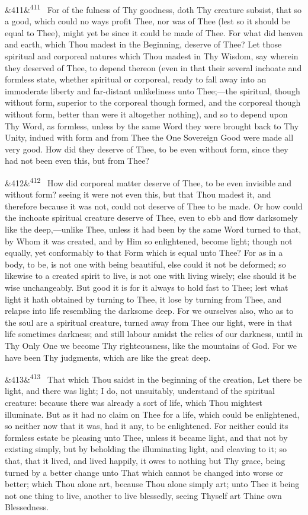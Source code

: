 \documentclass[12pt]{article}
\newcommand{\para}[1][]{\par\noindent\ifx&#1&\else\textsuperscript{\footnotesize #1}~\fi}
\begin{document}
\para[411] For of the fulness of Thy goodness, doth Thy creature subsist, that so a good, which could no ways profit Thee, nor was of Thee (lest so it should be equal to Thee), might yet be since it could be made of Thee. For what did heaven and earth, which Thou madest in the Beginning, deserve of Thee? Let those spiritual and corporeal natures which Thou madest in Thy Wisdom, say wherein they deserved of Thee, to depend thereon (even in that their several inchoate and formless state, whether spiritual or corporeal, ready to fall away into an immoderate liberty and far-distant unlikeliness unto Thee;---the spiritual, though without form, superior to the corporeal though formed, and the corporeal though without form, better than were it altogether nothing), and so to depend upon Thy Word, as formless, unless by the same Word they were brought back to Thy Unity, indued with form and from Thee the One Sovereign Good were made all very good. How did they deserve of Thee, to be even without form, since they had not been even this, but from Thee?

\para[412] How did corporeal matter deserve of Thee, to be even invisible and without form? seeing it were not even this, but that Thou madest it, and therefore because it was not, could not deserve of Thee to be made. Or how could the inchoate spiritual creature deserve of Thee, even to ebb and flow darksomely like the deep,---unlike Thee, unless it had been by the same Word turned to that, by Whom it was created, and by Him so enlightened, become light; though not equally, yet conformably to that Form which is equal unto Thee? For as in a body, to be, is not one with being beautiful, else could it not be deformed; so likewise to a created spirit to live, is not one with living wisely; else should it be wise unchangeably. But good it is for it always to hold fast to Thee; lest what light it hath obtained by turning to Thee, it lose by turning from Thee, and relapse into life resembling the darksome deep. For we ourselves also, who as to the soul are a spiritual creature, turned away from Thee our light, were in that life sometimes darkness; and still labour amidst the relics of our darkness, until in Thy Only One we become Thy righteousness, like the mountains of God. For we have been Thy judgments, which are like the great deep.

\para[413] That which Thou saidst in the beginning of the creation, Let there be light, and there was light; I do, not unsuitably, understand of the spiritual creature: because there was already a sort of life, which Thou mightest illuminate. But as it had no claim on Thee for a life, which could be enlightened, so neither now that it was, had it any, to be enlightened. For neither could its formless estate be pleasing unto Thee, unless it became light, and that not by existing simply, but by beholding the illuminating light, and cleaving to it; so that, that it lived, and lived happily, it owes to nothing but Thy grace, being turned by a better change unto That which cannot be changed into worse or better; which Thou alone art, because Thou alone simply art; unto Thee it being not one thing to live, another to live blessedly, seeing Thyself art Thine own Blessedness.
\end{document}
